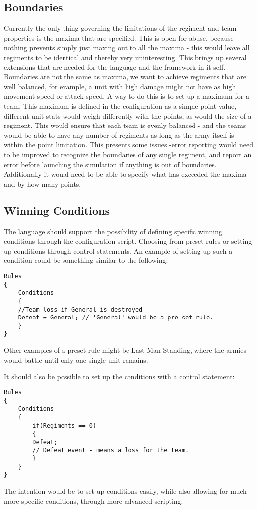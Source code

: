 \subsection{Boundaries}
Currently the only thing governing the limitations of the regiment and team properties is the maxima that are specified. This is open for abuse, because nothing prevents simply just maxing out to all the maxima - this would leave all regiments to be identical and thereby very uninteresting. This brings up several extensions that are needed for the language and the framework in it self. Boundaries are not the same as maxima, we want to achieve regiments that are well balanced, for example, a unit with high damage might not have as high movement speed or attack speed. A way to do this is to set up a maximum for a team. This maximum is defined in the configuration as a simple point value, different unit-stats would weigh differently with the points, as would the size of a regiment. This would ensure that each team is evenly balanced - and the teams would be able to have any number of regiments as long as the army itself is within the point limitation.
This presents some issues -error reporting would need to be improved to recognize the boundaries of any single regiment, and report an error before launching the simulation if anything is out of boundaries. Additionally it would need to be able to specify what has exceeded the maxima and by how many points.
\subsection{Winning Conditions}
The language should support the possibility of defining specific winning conditions through the configuration script. Choosing from preset rules or setting up conditions through control statements.
An example of setting up such a condition could be something similar to the following:

\begin{lstlisting}
Rules
{
	Conditions
	{
	//Team loss if General is destroyed
	Defeat = General; // 'General' would be a pre-set rule.
	}
}

\end{lstlisting}
Other examples of a preset rule might be Last-Man-Standing, where the armies would battle until only one single unit remains.

It should also be possible to set up the conditions with a control statement:
\begin{lstlisting}
Rules
{
	Conditions
	{
		if(Regiments == 0)
		{
		Defeat; 
		// Defeat event - means a loss for the team.
		}
	}
}

\end{lstlisting}
The intention would be to set up conditions easily, while also allowing for much more specific conditions, through more advanced scripting.
